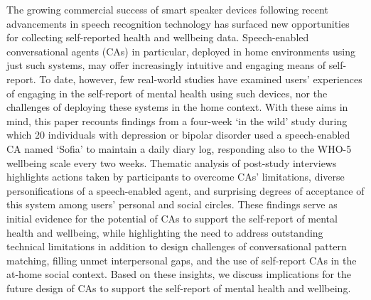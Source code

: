 % 
The growing commercial success of smart speaker devices following recent advancements in speech recognition technology has surfaced new opportunities for collecting self-reported health and wellbeing data. Speech-enabled conversational agents (CAs) in particular, deployed in home environments using just such systems, may offer increasingly intuitive and engaging means of self-report. To date, however, few real-world studies have examined users' experiences of engaging in the self-report of mental health using such devices, nor the challenges of deploying these systems in the home context.
% 
With these aims in mind, this paper recounts findings from a four-week `in the wild' study during which 20 individuals with depression or bipolar disorder used a speech-enabled CA named `Sofia' to maintain a daily diary log, responding also to the WHO-5 wellbeing scale every two weeks.
% 
Thematic analysis of post-study interviews highlights actions taken by participants to overcome CAs' limitations, diverse personifications of a speech-enabled agent, and surprising degrees of acceptance of this system among users' personal and social circles.
% 
These findings serve as initial evidence for the potential of CAs to support the self-report of mental health and wellbeing, while highlighting the need to address outstanding technical limitations in addition to design challenges of conversational pattern matching, filling unmet interpersonal gaps, and the use of self-report \ac{CA}s in the at-home social context.
% 
Based on these insights, we discuss implications for the future design of CAs to support the self-report of mental health and wellbeing.

